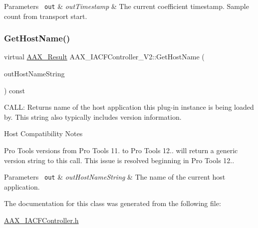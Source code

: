 \begin{DoxyParams}[1]{Parameters}
\mbox{\texttt{ out}}  & {\em out\+Timestamp} & The current coefficient timestamp. Sample count from transport start. \\
\hline
\end{DoxyParams}
\mbox{\label{a01641_aeac17aa11caa18994fb891109681d0d6}} 
\subsubsection{\texorpdfstring{GetHostName()}{GetHostName()}}
{\footnotesize\ttfamily virtual \mbox{\hyperlink{a00392_a4d8f69a697df7f70c3a8e9b8ee130d2f}{A\+A\+X\+\_\+\+Result}} A\+A\+X\+\_\+\+I\+A\+C\+F\+Controller\+\_\+\+V2\+::\+Get\+Host\+Name (\begin{DoxyParamCaption}\item[{\mbox{\hyperlink{a01873}{A\+A\+X\+\_\+\+I\+String}} $\ast$}]{out\+Host\+Name\+String }\end{DoxyParamCaption}) const\hspace{0.3cm}{\ttfamily [pure virtual]}}



C\+A\+LL\+: Returns name of the host application this plug-\/in instance is being loaded by. This string also typically includes version information. 

\begin{DoxyRefDesc}{Host Compatibility Notes}
\item[\mbox{\hyperlink{a00786__compatibility_notes000058}{Host Compatibility Notes}}]Pro Tools versions from Pro Tools 11. to Pro Tools 12.. will return a generic version string to this call. This issue is resolved beginning in Pro Tools 12..\end{DoxyRefDesc}



\begin{DoxyParams}[1]{Parameters}
\mbox{\texttt{ out}}  & {\em out\+Host\+Name\+String} & The name of the current host application. \\
\hline
\end{DoxyParams}


The documentation for this class was generated from the following file\+:\begin{DoxyCompactItemize}
\item 
\mbox{\hyperlink{a00515}{A\+A\+X\+\_\+\+I\+A\+C\+F\+Controller.\+h}}\end{DoxyCompactItemize}
